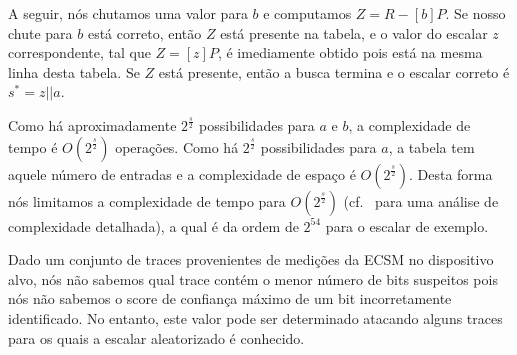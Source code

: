 A seguir, nós chutamos uma valor para $b$ e computamos $Z = R - [b] P$. Se nosso chute para $b$ está correto, então $Z$ está presente na tabela, e o valor do escalar $z$ correspondente, tal que $Z = [z] P$, é imediamente obtido pois está na mesma linha desta tabela.
Se $Z$ está presente, então a busca termina e o escalar correto é $s^* = z||a$.


Como há aproximadamente $2^{\frac{s}{2}}$ possibilidades para $a$ e $b$, a complexidade de tempo é $O(2^{\frac{s}{2}})$ operações.
Como há $2^{\frac{s}{2}}$ possibilidades para $a$, a tabela tem aquele número de entradas e a complexidade de espaço é $O(2^{\frac{s}{2}})$.
Desta forma nós limitamos a complexidade de tempo para $O(2^{\frac{s}{2}})$ (cf.~\cite{Gopalakrishnan2007} para uma análise de complexidade detalhada), a qual é da ordem de $2^54$ para o escalar de exemplo.



Dado um conjunto de traces provenientes de medições da ECSM no dispositivo alvo, nós não sabemos qual trace contém o menor número de bits suspeitos pois nós não sabemos o score de confiança máximo de um bit incorretamente identificado.
No entanto, este valor pode ser determinado atacando alguns traces para os quais a escalar aleatorizado é conhecido.


